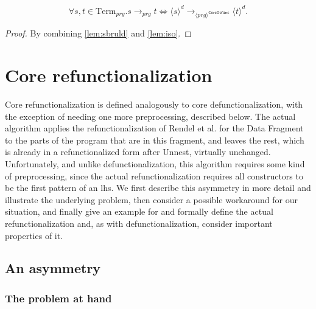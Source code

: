 \begin{corollary}
\[
\forall s,t \in \textrm{Term}_{prg}. s \longrightarrow_{prg} t \iff \langle s \rangle^d \longrightarrow_{\langle prg \rangle^{\textsf{CoreDefunc}}} \langle t \rangle^d.
\]
\begin{proof}
By combining \autoref{lem:sbruld} and \autoref{lem:iso}.
\end{proof}
\end{corollary}

\section{Core refunctionalization}
\label{sec:corerefunc}

Core refunctionalization is defined analogously to core defunctionalization, with the exception of needing one more preprocessing, described below. The actual algorithm applies the refunctionalization of Rendel et al.\cite{rendel15automatic} for the Data Fragment to the parts of the program that are in this fragment, and leaves the rest, which is already in a refunctionalized form after \textsf{Unnest}, virtually unchanged. Unfortunately, and unlike defunctionalization, this algorithm requires some kind of preprocessing, since the actual refunctionalization requires all constructors to be the first pattern of an lhs. We first describe this asymmetry in more detail and illustrate the underlying problem, then consider a possible workaround for our situation, and finally give an example for and formally define the actual refunctionalization and, as with defunctionalization, consider important properties of it.

\subsection{An asymmetry}

\subsubsection{The problem at hand}
\label{sssec:asym}

